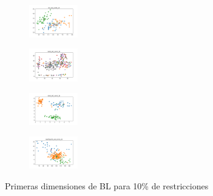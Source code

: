 \begin{figure}[H]
\begin{subfigure}
    \end{subfigure}
    \hfill
    \begin{subfigure}
        \centering
        \includegraphics[width=0.234\textwidth]{img/bl/iris_set_const_10_3773969821_clust.png}
    \end{subfigure}
    \hfill
    \begin{subfigure}
        \centering
        \includegraphics[width=0.234\textwidth]{img/bl/ecoli_set_const_10_3773969821_clust.png}
    \end{subfigure}
    \hfill
    \begin{subfigure}
        \centering
        \includegraphics[width=0.234\textwidth]{img/bl/rand_set_const_10_3773969821_clust.png}
    \end{subfigure}
    \hfill
    \begin{subfigure}
        \centering
        \includegraphics[width=0.234\textwidth]{img/bl/newthyroid_set_const_10_3773969821_clust.png}
    \end{subfigure}
    \caption{Primeras dimensiones de BL para 10\% de restricciones}
\end{figure}

\vspace*{\fill}
\newpage
\vspace*{\fill}

